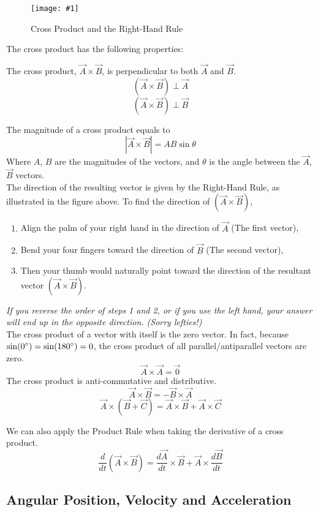 \documentclass[11pt]{article}
\newcommand{\fig}[4]{
    \begin{figure}[H]
        \centering
        \texttt{[image: \#1]}
        \caption{#2}
        \label{exp4fit}
    \end{figure}
}
\theoremstyle{gangnamstyle}{\newtheorem{definition}{Definition}[]}
\theoremstyle{gangnamstyle}{\newtheorem{example}{Example}[]}
\theoremstyle{gangnamstyle}{\newtheorem{problem}{Problem}[]}
\begin{document}
\fig{../notes/figs/n0/times.png}{Cross Product and the Right-Hand Rule}{0.35}{0} 

The cross product has the following properties: 

The cross product, $\Vec{A} \times \Vec{B}$, is perpendicular to both $\Vec{A}$ and $\Vec{B}$. 
\[ (\Vec{A} \times \Vec{B}) \perp \Vec{A} \]
\[ (\Vec{A} \times \Vec{B}) \perp \Vec{B} \]

The magnitude of a cross product equals to
\[ |\Vec{A} \times \Vec{B}| = AB \sin\theta \]
Where $A$, $B$ are the magnitudes of the vectors, and $\theta$ is the angle between the $\Vec{A}$, $\Vec{B}$ vectors. \\

The direction of the resulting vector is given by the Right-Hand Rule, as illustrated in the figure above. To find the direction of $(\Vec{A} \times \Vec{B})$, 
\begin{enumerate}
\item Align the palm of your right hand in the direction of $\Vec{A}$ (The first vector),
\item Bend your four fingers toward the direction of $\Vec{B}$ (The second vector),
\item Then your thumb would naturally point toward the direction of the resultant vector $(\Vec{A} \times \Vec{B})$. 
\end{enumerate}
\textit{If you reverse the order of steps 1 and 2, or if you use the left hand, your answer will end up in the opposite direction. (Sorry lefties!)} \\

The cross product of a vector with itself is the zero vector. In fact, because $\sin(0 \degree) = \sin(180 \degree) = 0$, the cross product of all parallel/antiparallel vectors are zero. 
\[ \Vec{A} \times \Vec{A} = \Vec{0} \]
The cross product is anti-commutative and distributive. 
\[ \Vec{A} \times \Vec{B} = - \Vec{B} \times \Vec{A} \]
\[ \Vec{A} \times (\Vec{B} + \Vec{C}) = \Vec{A} \times \Vec{B} + \Vec{A} \times \Vec{C} \]

We can also apply the Product Rule when taking the derivative of a cross product. 
\[ \frac{d}{dt}(\Vec{A} \times \Vec{B}) = \frac{d\Vec{A}}{dt} \times \Vec{B} + \Vec{A} \times \frac{d\Vec{B}}{dt} \]

\subsection{Angular Position, Velocity and Acceleration}
\end{document}
